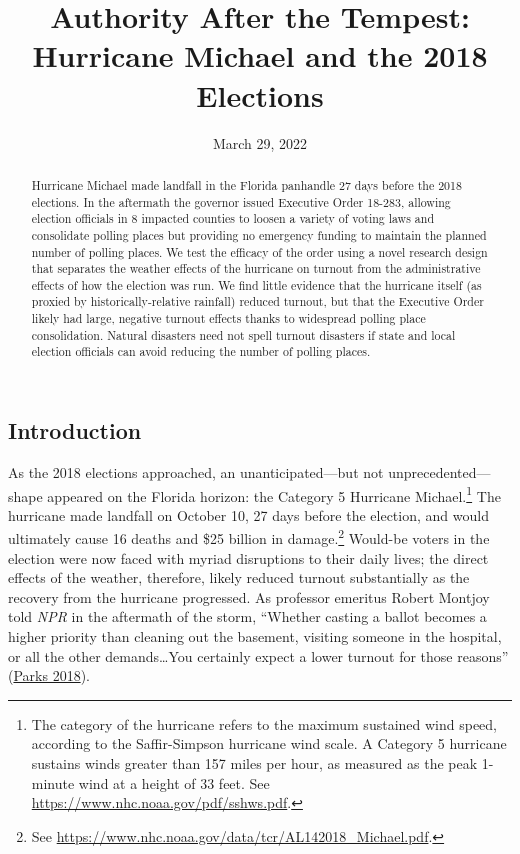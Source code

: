 \documentclass[
  12pt,
]{article}
\title{Authority After the Tempest: Hurricane Michael and the 2018 Elections}
\author{}
\date{\vspace{-2.5em}March 29, 2022}
\begin{document}
\maketitle
\begin{abstract}
Hurricane Michael made landfall in the Florida panhandle 27 days before the 2018 elections. In the aftermath the governor issued Executive Order 18-283, allowing election officials in 8 impacted counties to loosen a variety of voting laws and consolidate polling places but providing no emergency funding to maintain the planned number of polling places. We test the efficacy of the order using a novel research design that separates the weather effects of the hurricane on turnout from the administrative effects of how the election was run. We find little evidence that the hurricane itself (as proxied by historically-relative rainfall) reduced turnout, but that the Executive Order likely had large, negative turnout effects thanks to widespread polling place consolidation. Natural disasters need not spell turnout disasters if state and local election officials can avoid reducing the number of polling places.
\end{abstract}

\pagebreak

\doublespacing

\hypertarget{introduction}{%
\subsection*{Introduction}\label{introduction}}

As the 2018 elections approached, an unanticipated---but not unprecedented---shape appeared on the Florida horizon: the Category 5 Hurricane Michael.\footnote{The category of the hurricane refers to the maximum sustained wind speed, according to the Saffir-Simpson hurricane wind scale. A Category 5 hurricane sustains winds greater than 157 miles per hour, as measured as the peak 1-minute wind at a height of 33 feet. See \url{https://www.nhc.noaa.gov/pdf/sshws.pdf}.} The hurricane made landfall on October 10, 27 days before the election, and would ultimately cause 16 deaths and \$25 billion in damage.\footnote{See \url{https://www.nhc.noaa.gov/data/tcr/AL142018_Michael.pdf}.} Would-be voters in the election were now faced with myriad disruptions to their daily lives; the direct effects of the weather, therefore, likely reduced turnout substantially as the recovery from the hurricane progressed. As professor emeritus Robert Montjoy told \emph{NPR} in the aftermath of the storm, ``Whether casting a ballot becomes a higher priority than cleaning out the basement, visiting someone in the hospital, or all the other demands\ldots You certainly expect a lower turnout for those reasons'' (\protect\hyperlink{ref-Parks2018}{Parks 2018}).
\end{document}
